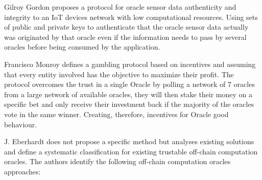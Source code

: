 Gilroy Gordon \cite{Gordon2017ProvenanceSensorsb} proposes a protocol for oracle sensor data authenticity and integrity to an IoT devices network with low computational resources. Using sets of public and private keys to authenticate that the oracle sensor data actually was originated by that oracle even if the information needs to pass by several oracles before being consumed by the application.

Francisco Monroy \cite{MontotoMonroy2018BitcoinBlockchain} defines a gambling protocol based on incentives and assuming that every entity involved has the objective to maximize their profit. The protocol overcomes the trust in a single Oracle by polling a network of 7 oracles from a large network of available oracles, they will then stake their money on a specific bet and only receive their investment back if the majority of the oracles vote in the same winner. Creating, therefore, incentives for Oracle good behaviour.

J. Eberhardt \cite{Eberhardt2018Off-chainingComputations} does not propose a specific method but analyses existing solutions and define a systematic classification for existing trustable off-chain computation oracles. The authors identify the following off-chain computation oracles approaches:



